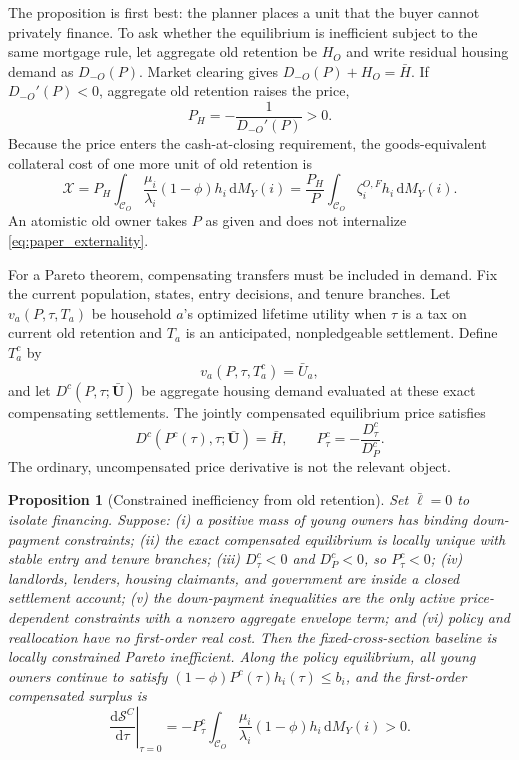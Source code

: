 \documentclass[11pt]{article}
\newtheorem{proposition}{Proposition}
\newcommand{\dd}{\mathrm d}
\newcommand{\1}{\mathbf 1}
\newcommand{\ellbar}{\bar\ell}
\begin{document}
The proposition is first best: the planner places a unit that the buyer cannot
privately finance. To ask whether the equilibrium is inefficient subject to
the same mortgage rule, let aggregate old retention be $H_O$ and write residual
housing demand as $D_{-O}(P)$. Market clearing gives
$D_{-O}(P)+H_O=\bar H$. If $D_{-O}'(P)<0$, aggregate old retention raises the
price,
\begin{equation}
P_H=-\frac{1}{D_{-O}'(P)}>0.
\label{eq:paper_price_response}
\end{equation}
Because the price enters the cash-at-closing requirement, the goods-equivalent
collateral cost of one more unit of old retention is
\begin{equation}
\mathcal X
=P_H\int_{\mathcal C_O}
\frac{\mu_i}{\lambda_i}(1-\phi)h_i\,\dd M_Y(i)
=\frac{P_H}{P}\int_{\mathcal C_O}
\zeta_i^{O,F}h_i\,\dd M_Y(i).
\label{eq:paper_externality}
\end{equation}
An atomistic old owner takes $P$ as given and does not internalize
\eqref{eq:paper_externality}.

For a Pareto theorem, compensating transfers must be included in demand. Fix
the current population, states, entry decisions, and tenure branches. Let
$v_a(P,\tau,T_a)$ be household $a$'s optimized lifetime utility when $\tau$ is
a tax on current old retention and $T_a$ is an anticipated, nonpledgeable
settlement. Define $T_a^c$ by
\begin{equation}
v_a(P,\tau,T_a^c)=\bar U_a,
\end{equation}
and let $D^c(P,\tau;\bar{\mathbf U})$ be aggregate housing demand evaluated at
these exact compensating settlements. The jointly compensated equilibrium
price satisfies
\begin{equation}
D^c(P^c(\tau),\tau;\bar{\mathbf U})=\bar H,
\qquad
P_\tau^c=-\frac{D_\tau^c}{D_P^c}.
\label{eq:paper_compensated_price}
\end{equation}
The ordinary, uncompensated price derivative is not the relevant object.

\begin{proposition}[Constrained inefficiency from old retention]
Set $\ellbar=0$ to isolate financing. Suppose: (i) a positive mass of young
owners has binding down-payment constraints; (ii) the exact compensated
equilibrium is locally unique with stable entry and tenure branches;
(iii) $D_\tau^c<0$ and $D_P^c<0$, so $P_\tau^c<0$; (iv) landlords, lenders,
housing claimants, and government are inside a closed settlement account;
(v) the down-payment inequalities are the only active price-dependent
constraints with a nonzero aggregate envelope term; and (vi) policy and
reallocation have no first-order real cost. Then the fixed-cross-section
baseline is locally constrained Pareto inefficient. Along the policy
equilibrium, all young owners continue to satisfy
$(1-\phi)P^c(\tau)h_i(\tau)\le b_i$, and the first-order compensated surplus is
\begin{equation}
\left.\frac{\dd\mathcal S^C}{\dd\tau}\right|_{\tau=0}
=-P_\tau^c
\int_{\mathcal C_O}
\frac{\mu_i}{\lambda_i}(1-\phi)h_i\,\dd M_Y(i)>0.
\label{eq:paper_constrained_surplus}
\end{equation}
\end{proposition}
\end{document}
